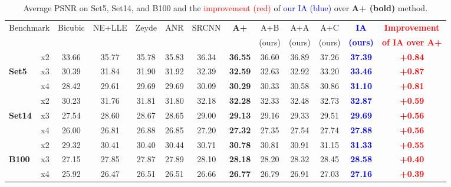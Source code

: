 \documentclass[10pt,twocolumn,letterpaper]{article}
\begin{document}
\begin{table*}
\vspace{-0.2cm}
\setlength{\tabcolsep}{4pt} 
\centering
\caption{Average PSNR on Set5, Set14, and B100 and the \textcolor{red}{improvement (red)} of \textcolor{blue}{our IA (blue)} over \textbf{A+ (bold)} method.
}
\vspace{0.01cm}
{
\begin{tabular}{lc||c c c c c c|c c c c|c}
\multicolumn{2}{c||}{Benchmark}&Bicubic&NE+LLE&Zeyde&ANR& SRCNN&\textbf{A+}&A+B&A+A&A+C&\textcolor{blue}{\bf IA}&\textcolor{red}{\bf Improvement}\\
\multicolumn{2}{c||}{ } &&\cite{Timofte-ICCV-2013}&\cite{Zeyde-CS-2012}&\cite{Timofte-ICCV-2013}& \cite{Dong-ECCV-2014}&\cite{Timofte-ACCV-2014}&(ours)&(ours)&(ours) &\textcolor{blue}{\bf (ours)}&\textcolor{red}{\bf of IA over A+}\\
\hline\hline
              & x2 & 33.66 & 35.77 & 35.78 & 35.83 & 36.34 &\textbf{36.55}&36.60&36.89&37.26&\textcolor{blue}{\bf 37.39}&\textcolor{red}{\bf +0.84}\\
\textbf{Set5 }& x3 & 30.39 & 31.84 & 31.90 & 31.92 & 32.39 &\textbf{32.59}&32.63&32.92&33.20&\textcolor{blue}{\bf 33.46}&\textcolor{red}{\bf+0.87}\\
              & x4 & 28.42 & 29.61 & 29.69 & 29.69 & 30.09 &\textbf{30.29}&30.33&30.58&30.86&\textcolor{blue}{\bf 31.10}&\textcolor{red}{\bf+0.81}\\
\hline
              & x2 & 30.23 & 31.76 & 31.81 & 31.80 & 32.18 &\textbf{32.28}&32.33&32.48&32.73&\textcolor{blue}{\bf 32.87}&\textcolor{red}{\bf+0.59}\\
\textbf{Set14}& x3 & 27.54 & 28.60 & 28.67 & 28.65 & 29.00 &\textbf{29.13}&29.16&29.33&29.51&\textcolor{blue}{\bf 29.69}&\textcolor{red}{\bf+0.56}\\
              & x4 & 26.00 & 26.81 & 26.88 & 26.85 & 27.20 &\textbf{27.32}&27.35&27.54&27.74&\textcolor{blue}{\bf 27.88}&\textcolor{red}{\bf+0.56}\\
              
\hline

             & x2 & 29.32 & 30.41 & 30.40 & 30.44 & 30.71 &\textbf{30.78}&30.81&30.91&31.15&\textcolor{blue}{\bf 31.33}&\textcolor{red}{\bf+0.55}\\
\textbf{B100}& x3 & 27.15 & 27.85 & 27.87 & 27.89 & 28.10 &\textbf{28.18}&28.20&28.32&28.45&\textcolor{blue}{\bf 28.58}&\textcolor{red}{\bf+0.40}\\
             & x4 & 25.92 & 26.47 & 26.51 & 26.51 & 26.66 &\textbf{26.77}&26.79&26.91&27.03&\textcolor{blue}{\bf 27.16}&\textcolor{red}{\bf+0.39}\\


\end{tabular}
}
\label{tab:avg_results}
\vspace{-0.5cm}
\end{table*}
\end{document}
